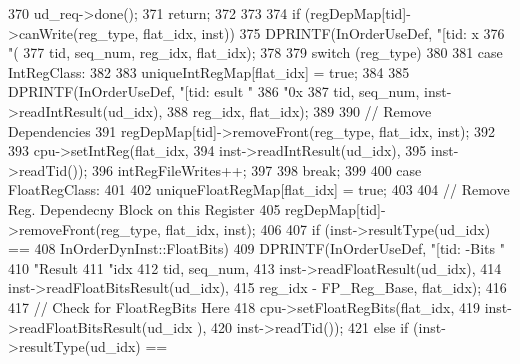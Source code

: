 \begin{DoxyCode}
{{{{370                 ud_req->done();
371                 return;
372             }
373 
374             if (regDepMap[tid]->canWrite(reg_type, flat_idx, inst)) {
375                 DPRINTF(InOrderUseDef, "[tid:%
      x %
376                         "(%
377                         tid, seq_num, reg_idx, flat_idx);
378 
379                 switch (reg_type)
380                 {
381                   case IntRegClass:
382                     {
383                         uniqueIntRegMap[flat_idx] = true;
384 
385                         DPRINTF(InOrderUseDef, "[tid:%
      esult "
386                                 "0x%
387                                 tid, seq_num, inst->readIntResult(ud_idx),
388                                 reg_idx, flat_idx);
389 
390                         // Remove Dependencies
391                         regDepMap[tid]->removeFront(reg_type, flat_idx, inst);
392 
393                         cpu->setIntReg(flat_idx,
394                                        inst->readIntResult(ud_idx),
395                                        inst->readTid());
396                         intRegFileWrites++;
397                     }
398                     break;
399 
400                   case FloatRegClass:
401                     {
402                         uniqueFloatRegMap[flat_idx] = true;
403 
404                         // Remove Reg. Dependecny Block on this Register
405                         regDepMap[tid]->removeFront(reg_type, flat_idx, inst);
406 
407                         if (inst->resultType(ud_idx) == 
408                             InOrderDynInst::FloatBits) {
409                             DPRINTF(InOrderUseDef, "[tid:%
      -Bits "
410                                     "Result %
411                                     "idx %
412                                     tid, seq_num,
413                                     inst->readFloatResult(ud_idx), 
414                                     inst->readFloatBitsResult(ud_idx),
415                                     reg_idx - FP_Reg_Base, flat_idx);
416 
417                             // Check for FloatRegBits Here
418                             cpu->setFloatRegBits(flat_idx,
419                                                  inst->readFloatBitsResult(ud_idx
      ),
420                                                  inst->readTid());
421                         } else if (inst->resultType(ud_idx) == 
}}}}}}
\end{DoxyCode}
